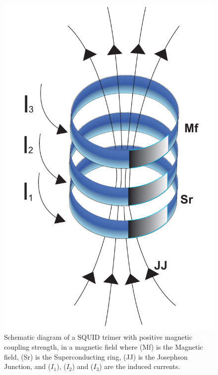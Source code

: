 \documentclass[aps,pre,reprint,groupedaddress]{revtex4-1}
\begin{document}
\begin{figure}
	\includegraphics[scale=0.27]{Fig00}%
	\caption{ Schematic diagram of a SQUID trimer with  positive magnetic coupling strength,
		in a magnetic field where (Mf) is the Magnetic field, (Sr) is the Superconducting ring,
		(JJ) is the Josephson Junction, and ($I_{1}$), ($I_{2}$) and ($I_{3}$) are the induced currents.} \label{fig00}
\end{figure} 
\end{document}
